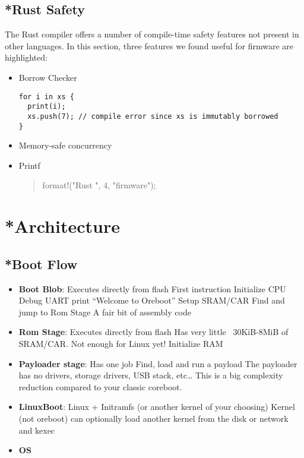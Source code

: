 \documentclass[conference]{IEEEtran}
\begin{document}
\subsection{*Rust Safety}

The Rust compiler offers a number of compile-time safety features not present in other languages. In this section, three features we found useful for firmware are highlighted:

\begin{itemize}
    \item Borrow Checker
        \begin{verbatim}
for i in xs {
  print(i);
  xs.push(7); // compile error since xs is immutably borrowed
}
        \end{verbatim}
    \item Memory-safe concurrency
    \item Printf \begin{quote}format!("Rust {} {}", 4, "firmware");\end{quote}
\end{itemize}

\section{*Architecture}

\subsection{*Boot Flow}

\begin{itemize}
    \item \textbf{Boot Blob}: Executes directly from flash
First instruction
Initialize CPU
Debug UART print “Welcome to Oreboot”
Setup SRAM/CAR
Find and jump to Rom Stage
A fair bit of assembly code
    \item \textbf{Rom Stage}: Executes directly from flash
Has very little ~30KiB-8MiB of SRAM/CAR. Not enough for Linux yet!
Initialize RAM
    \item \textbf{Payloader stage}: Has one job
Find, load and run a payload
The payloader has no drivers, storage drivers, USB stack, etc… This is a big complexity reduction compared to your classic coreboot.
    \item \textbf{LinuxBoot}: Linux + Initramfs (or another kernel of your choosing)
Kernel (not oreboot) can optionally load another kernel from the disk or network and kexec
    \item \textbf{OS}
\end{itemize}
\end{document}
